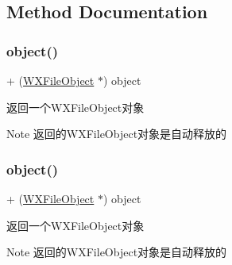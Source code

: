 \subsection{Method Documentation}
\mbox{\label{interface_w_x_file_object_a3372d1562694c571a0627e7c97f47fcc}} 
\subsubsection{\texorpdfstring{object()}{object()}\hspace{0.1cm}{\footnotesize\ttfamily [1/3]}}
{\footnotesize\ttfamily + (\mbox{\hyperlink{interface_w_x_file_object}{W\+X\+File\+Object}} $\ast$) object \begin{DoxyParamCaption}{ }\end{DoxyParamCaption}}



返回一个\+W\+X\+File\+Object对象 

\begin{DoxyNote}{Note}
返回的\+W\+X\+File\+Object对象是自动释放的 
\end{DoxyNote}
\mbox{\label{interface_w_x_file_object_a3372d1562694c571a0627e7c97f47fcc}} 
\subsubsection{\texorpdfstring{object()}{object()}\hspace{0.1cm}{\footnotesize\ttfamily [2/3]}}
{\footnotesize\ttfamily + (\mbox{\hyperlink{interface_w_x_file_object}{W\+X\+File\+Object}} $\ast$) object \begin{DoxyParamCaption}{ }\end{DoxyParamCaption}}



返回一个\+W\+X\+File\+Object对象 

\begin{DoxyNote}{Note}
返回的\+W\+X\+File\+Object对象是自动释放的 
\end{DoxyNote}
\mbox{\label{interface_w_x_file_object_a3372d1562694c571a0627e7c97f47fcc}} 
